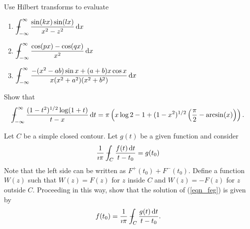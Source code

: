 \begin{Exercise}
  Use Hilbert transforms to evaluate
  \begin{enumerate}
  \item
    $ \displaystyle
    - \negthickspace \negthickspace \negthickspace \negmedspace\int_{-\infty}^\infty \frac{ \sin(k x) \sin(l x) }{ x^2 - z^2 } \,\mathrm{d} x
    $
  \item
    $ \displaystyle
    - \negthickspace \negthickspace \negthickspace \negmedspace\int_{-\infty}^\infty \frac{ \cos(p x) - \cos(q x) }{ x^2 }        \,\mathrm{d} x 
    $
  \item
    $ \displaystyle
    - \negthickspace \negthickspace \negthickspace \negmedspace\int_{-\infty}^\infty \frac{ - (x^2 - a b) \sin x 
      + (a + b) x \cos x } { x (x^2 + a^2)(x^2 + b^2) } \,\mathrm{d} x
    $
  \end{enumerate}
\end{Exercise}



\begin{Exercise}
  Show that
  \[
  - \negthickspace \negthickspace \negthickspace \negmedspace\int_{-\infty}^\infty \frac{ (1-t^2)^{1/2} \log(1+t) }{ t-x } \,\mathrm{d} t
  = \pi \left( x \log 2 - 1 + (1-x^2)^{1/2} \left( \frac{\pi}{2}
      - \arcsin(x) \right) \right).
  \]
\end{Exercise}



\begin{Exercise}
  Let $C$ be a simple closed contour.  Let $g(t)$ be a given function and 
  consider
  \begin{equation}
    \label{eqn_feg}
    \frac{1}{\imath \pi} - \negthickspace \negthickspace \negthickspace \negmedspace \int_C \frac{ f(t) \,\mathrm{d} t}{ t-t_0} = g(t_0)
  \end{equation}
  Note that the left side can be written as $F^+(t_0) + F^-(t_0)$.  Define
  a function $W(z)$ such that $W(z) = F(z)$ for $z$ inside $C$ and 
  $W(z) = - F(z)$ for $z$ outside $C$.  Proceeding in this way, show that
  the solution of (\ref{eqn_feg}) is given by
  \[
  f(t_0) = \frac{1}{\imath \pi} - \negthickspace \negthickspace \negthickspace \negmedspace \int_C \frac{ g(t) \,\mathrm{d} t}{t - t_0}.
  \]
\end{Exercise}





